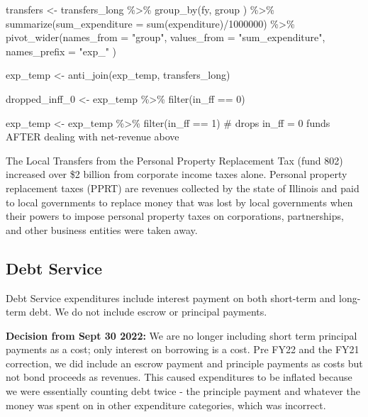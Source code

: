 \documentclass[
  letterpaper,
  DIV=11,
  numbers=noendperiod]{scrreport}
\newenvironment{Shaded}{\begin{snugshade}}{\end{snugshade}}
\newcommand{\AttributeTok}[1]{\textcolor[rgb]{0.40,0.45,0.13}{#1}}
\newcommand{\CommentTok}[1]{\textcolor[rgb]{0.37,0.37,0.37}{#1}}
\newcommand{\DecValTok}[1]{\textcolor[rgb]{0.68,0.00,0.00}{#1}}
\newcommand{\FunctionTok}[1]{\textcolor[rgb]{0.28,0.35,0.67}{#1}}
\newcommand{\NormalTok}[1]{\textcolor[rgb]{0.00,0.23,0.31}{#1}}
\newcommand{\OtherTok}[1]{\textcolor[rgb]{0.00,0.23,0.31}{#1}}
\newcommand{\SpecialCharTok}[1]{\textcolor[rgb]{0.37,0.37,0.37}{#1}}
\newcommand{\StringTok}[1]{\textcolor[rgb]{0.13,0.47,0.30}{#1}}
\begin{document}
\begin{Shaded}
\begin{Highlighting}[]
\NormalTok{transfers }\OtherTok{\textless{}{-}}\NormalTok{ transfers\_long }\SpecialCharTok{\%\textgreater{}\%}
  \FunctionTok{group\_by}\NormalTok{(fy, group ) }\SpecialCharTok{\%\textgreater{}\%}
  \FunctionTok{summarize}\NormalTok{(}\AttributeTok{sum\_expenditure =} \FunctionTok{sum}\NormalTok{(expenditure)}\SpecialCharTok{/}\DecValTok{1000000}\NormalTok{) }\SpecialCharTok{\%\textgreater{}\%}
  \FunctionTok{pivot\_wider}\NormalTok{(}\AttributeTok{names\_from =} \StringTok{"group"}\NormalTok{, }\AttributeTok{values\_from =} \StringTok{"sum\_expenditure"}\NormalTok{, }\AttributeTok{names\_prefix =} \StringTok{"exp\_"}\NormalTok{ )}

\NormalTok{exp\_temp }\OtherTok{\textless{}{-}} \FunctionTok{anti\_join}\NormalTok{(exp\_temp, transfers\_long)}


\NormalTok{dropped\_inff\_0 }\OtherTok{\textless{}{-}}\NormalTok{ exp\_temp }\SpecialCharTok{\%\textgreater{}\%} \FunctionTok{filter}\NormalTok{(in\_ff }\SpecialCharTok{==} \DecValTok{0}\NormalTok{)}

\NormalTok{exp\_temp }\OtherTok{\textless{}{-}}\NormalTok{ exp\_temp }\SpecialCharTok{\%\textgreater{}\%} \FunctionTok{filter}\NormalTok{(in\_ff }\SpecialCharTok{==} \DecValTok{1}\NormalTok{) }\CommentTok{\# drops in\_ff = 0 funds AFTER dealing with net{-}revenue above}
\end{Highlighting}
\end{Shaded}

The Local Transfers from the Personal Property Replacement Tax (fund
802) increased over \$2 billion from corporate income taxes alone.
Personal property replacement taxes (PPRT) are revenues collected by the
state of Illinois and paid to local governments to replace money that
was lost by local governments when their powers to impose personal
property taxes on corporations, partnerships, and other business
entities were taken away.

\hypertarget{debt-service}{%
\subsection{Debt Service}\label{debt-service}}

Debt Service expenditures include interest payment on both short-term
and long-term debt. We do not include escrow or principal payments.

\textbf{Decision from Sept 30 2022:} We are no longer including short
term principal payments as a cost; only interest on borrowing is a cost.
Pre FY22 and the FY21 correction, we did include an escrow payment and
principle payments as costs but not bond proceeds as revenues. This
caused expenditures to be inflated because we were essentially counting
debt twice - the principle payment and whatever the money was spent on
in other expenditure categories, which was incorrect.
\end{document}
